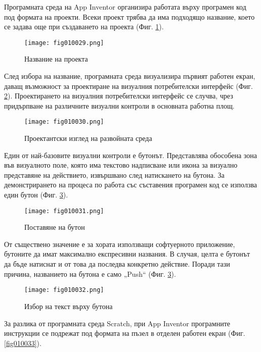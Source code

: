 Програмната среда на App Inventor организира работата върху програмен код под формата на проекти. Всеки проект трябва да има подходящо название, което се задава още при създаването на проекта (Фиг. \ref{fig010029}).

\begin{figure}[H]
  \centering
  \texttt{[image: fig010029.png]}
  \caption{Название на проекта}
\label{fig010029}
\end{figure}

След избора на название, програмната среда визуализира първият работен екран, даващ възможност за проектиране на визуалния потребителски интерфейс (Фиг. \ref{fig010030}). Проектирането на визуалния потребителски интерфейс се случва, чрез придърпване на различните визуални контроли в основната работна площ. 

\begin{figure}[H]
  \centering
  \texttt{[image: fig010030.png]}
  \caption{Проектантски изглед на развойната среда}
\label{fig010030}
\end{figure}

Един от най-базовите визуални контроли е бутонът. Представлява обособена зона във визуалното поле, която има текстово надписване или икона за визуално представяне на действието, извършвано след натискането на бутона. За демонстрирането на процеса по работа със съставения програмен код се използва един бутон (Фиг. \ref{fig010031}).

\begin{figure}[H]
  \centering
  \texttt{[image: fig010031.png]}
  \caption{Поставяне на бутон}
\label{fig010031}
\end{figure}

От съществено значение е за хората използващи софтуерното приложение, бутоните да имат максимално експресивни названия. В случая, целта е бутонът да бъде натиснат и от това да последва конкретно действие. Поради тази причина, названието на бутона е само „Push“ (Фиг. \ref{fig010031}).

\begin{figure}[H]
  \centering
  \texttt{[image: fig010032.png]}
  \caption{Избор на текст върху бутона}
\label{fig010032}
\end{figure}

За разлика от програмната среда Scratch, при App Inventor програмните инструкции се подрежат под формата на пъзел в отделен работен екран (Фиг. \ref{fig010033}). 

